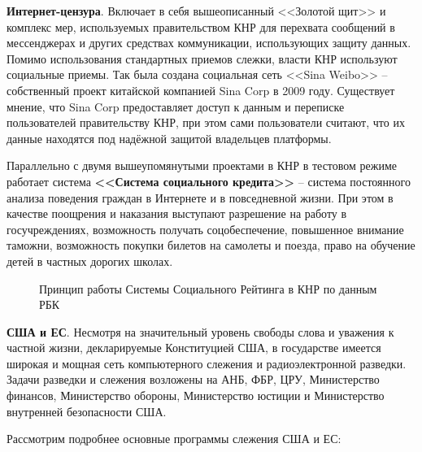 	\textbf{Интернет-цензура}. Включает в себя вышеописанный <<Золотой щит>> и комплекс мер, используемых правительством КНР для перехвата сообщений в мессенджерах и других средствах коммуникации, использующих защиту данных. 	Помимо использования стандартных приемов слежки, власти КНР используют социальные приемы. Так была создана социальная сеть <<Sina Weibo>> -- собственный проект китайской компанией Sina Corp в 2009 году. Существует мнение, что Sina Corp предоставляет доступ к данным и переписке пользователей правительству КНР, при этом сами пользователи считают, что их данные находятся под надёжной защитой владельцев платформы. 
	
	Параллельно с двумя вышеупомянутыми проектами в КНР в тестовом режиме работает система \textbf{<<Система социального кредита>>} -- система постоянного анализа поведения граждан в Интернете и в повседневной жизни. При этом в качестве поощрения и наказания выступают разрешение на работу в госучреждениях, возможность получать соцобеспечение, повышенное внимание таможни, возможность покупки билетов на самолеты и поезда, право на обучение детей в частных дорогих школах.  \cite{SocialCredit} \cite{SocialCredit2} %
	\\
	\begin{figure*}[h!]
		\caption{ Принцип работы Системы Социального Рейтинга в КНР по данным РБК}
	\end{figure*} 
	\textbf{США и ЕС}. Несмотря на значительный уровень свободы слова и уважения к частной жизни, декларируемые Конституцией США, в государстве имеется широкая и мощная сеть компьютерного слежения и радиоэлектронной разведки. Задачи разведки  и слежения возложены на АНБ, ФБР, ЦРУ, Министерство финансов, Министерство обороны, Министерство юстиции и Министерство внутренней безопасности США.  
	
	Рассмотрим подробнее основные программы слежения США и ЕС:
	
